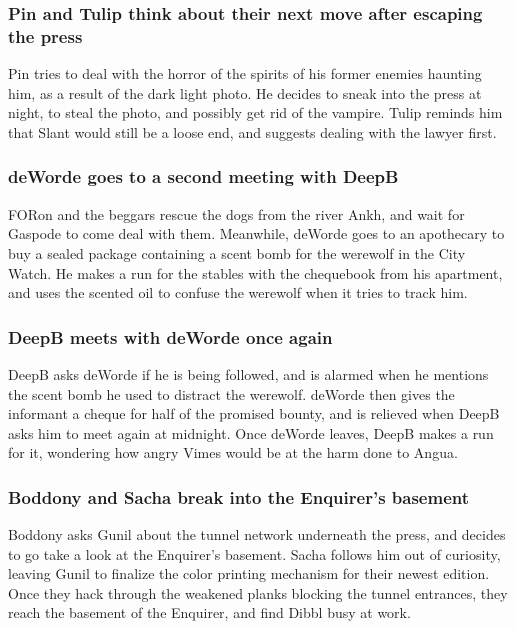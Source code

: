 \subsubsection{\Gls{Pin} and \Gls{Tulip} think about their next move after escaping the press}
\Gls{Pin} tries to deal with the horror of the spirits of his former enemies haunting him, as a
result of the dark light photo. He decides to sneak into the press at night, to steal the photo,
and possibly get rid of the vampire. \Gls{Tulip} reminds him that \Gls{Slant} would still be a loose
end, and suggests dealing with the lawyer first.

\subsubsection{\Gls{deWorde} goes to a second meeting with \Gls{DeepB}}
\Gls{FORon} and the beggars rescue the dogs from the river Ankh, and wait for \Gls{Gaspode} to come
deal with them. Meanwhile, \Gls{deWorde} goes to an apothecary to buy a sealed package containing
a scent bomb for the werewolf in the City Watch. He makes a run for the stables with the chequebook
from his apartment, and uses the scented oil to confuse the werewolf when it tries to track him.

\subsubsection{\Gls{DeepB} meets with \Gls{deWorde} once again}
\Gls{DeepB} asks \Gls{deWorde} if he is being followed, and is alarmed when he mentions the scent
bomb he used to distract the werewolf. \Gls{deWorde} then gives the informant a cheque for half of
the promised bounty, and is relieved when \Gls{DeepB} asks him to meet again at midnight. Once
\Gls{deWorde} leaves, \Gls{DeepB} makes a run for it, wondering how angry \Gls{Vimes} would be at
the harm done to \Gls{Angua}.

\subsubsection{\Gls{Boddony} and \Gls{Sacha} break into the Enquirer's basement}
\Gls{Boddony} asks \Gls{Gunil} about the tunnel network underneath the press, and decides to
go take a look at the Enquirer's basement. \Gls{Sacha} follows him out of curiosity, leaving
\Gls{Gunil} to finalize the color printing mechanism for their newest edition. Once they hack
through the weakened planks blocking the tunnel entrances, they reach the basement of the Enquirer,
and find \Gls{Dibbl} busy at work.

